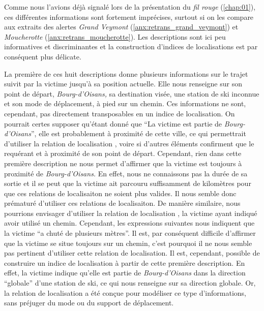 Comme nous l'avions déjà signalé lors de la présentation du \emph{fil
  rouge} (\autoref{chap:01}), ces différentes informations sont
fortement imprécises, surtout si on les compare aux extraits des
alertes \emph{Grand Veymont} (\autoref{anx:retrans_grand_veymont}) et
\emph{Moucherotte} (\autoref{anx:retrans_moucherotte}). Les
descriptions sont ici peu informatives et discriminantes et la
construction d'indices de localisations est par conséquent plus
délicate.

La première de ces huit descriptions donne plusieurs informations sur
le trajet suivit par la victime jusqu'à sa position actuelle. Elle
nous renseigne sur son point de départ, \emph{Bourg-d'Oisans,} sa
destination visée, une station de ski inconnue et son mode de
déplacement, à pied sur un chemin. Ces informations ne sont,
cependant, pas directement transposables en un indice de
localisation. On pourrait certes supposer qu'étant donné que
\enquote{La victime est partie de \emph{Bourg-d'Oisans}}, elle est
probablement à proximité de cette ville, ce qui permettrait d'utiliser
la relation de localisation , voire
 si d'autres éléments confirment que le requérant
et à proximité de son point de départ. Cependant, rien dans cette
première description ne nous permet d'affirmer que la victime est
toujours à proximité de \emph{Bourg-d'Oisans.} En effet, nous ne
connaissons pas la durée de sa sortie et il se peut que la victime ait
parcouru suffisamment de kilomètres pour que ces relations de
localisaiton ne soient plus valides. Il nous semble donc prématuré
d'utiliser ces relations de localisaiton. De manière similaire, nous
pourrions envisager d'utiliser la relation de localisation
, la victime
ayant indiqué avoir utilisé un chemin. Cependant, les expressions
suivantes nous indiquent que la victime \enquote{a chuté de plusieurs
  mètres}. Il est, par conséquent difficile d'affirmer que la victime
se situe toujours sur un chemin, c'est pourquoi il ne nous semble pas
pertinent d'utiliser cette relation de localisation. Il est,
cependant, possible de construire un indice de localisation à partir
de cette première description. En effet, la victime indique qu'elle
est partie de \emph{Bourg-d'Oisans} dans la direction
\enquote{globale} d'une station de ski, ce qui nous renseigne sur sa
direction globale. Or, la relation de localisation
 a été conçue pour
modéliser ce type d'informations, sans préjuger du mode ou du support
de déplacement.


